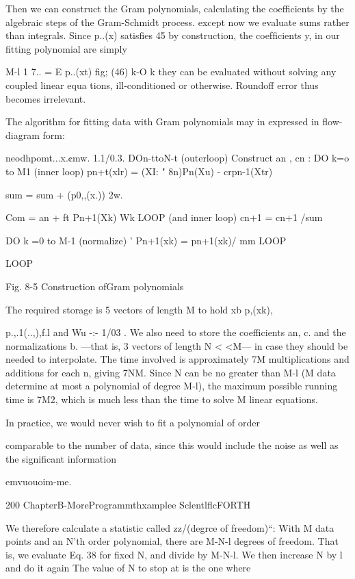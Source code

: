{{{{{{{Then we can construct the Gram polynomials, calculating the
coefficients by the algebraic steps of the Gram-Schmidt process.
except now we evaluate sums rather than integrals. Since p..(x)
satisﬁes 45 by construction, the coefﬁcients y, in our ﬁtting
polynomial are simply

M-l 1
7.. = E p..(xt) fig; (46)
k-O k
they can be evaluated without solving any coupled linear equa
tions, ill-conditioned or otherwise. Roundoff error thus becomes
irrelevant.

The algorithm for ﬁtting data with Gram polynomials may in
expressed in ﬂow-diagram form:

neodhpomt...x.¢mw. 1.1/0.3.
DOn-ttoN-t (outerloop)
Construct an , cn :
DO k=o to M1 (inner loop)
pn+t(xlr) = (XI: " 8n)Pn(Xu) - crpn-1(Xtr)

sum = sum + (p0,,(x.)) 2w.

Com = an + ft Pn+1(Xk) Wk
LOOP (and inner loop)
cn+1 = cn+1 /sum

DO k =0 to M-1 (normalize)
’ Pn+1(xk) = pn+1(xk)/ mm
LOOP

LOOP

 

 

Fig. 8-5 Construction ofGram polynomials

The required storage is 5 vectors of length M to hold xb p,(xk),

p.,.1(.\:.,),f.l and Wu -:- 1/03 . We also need to store the coefficients
an, c. and the normalizations b. —that is, 3 vectors of length
N < <M— in case they should be needed to interpolate. The time
involved is approximately 7M multiplications and additions for
each n, giving 7NM. Since N can be no greater than M-l (M data
determine at most a polynomial of degree M-l), the maximum
possible running time is 7M2, which is much less than the time to
solve M linear equations.

In practice, we would never wish to ﬁt a polynomial of order

comparable to the number of data, since this would include the
noise as well as the signiﬁcant information

emvuouoim-me.

200 ChapterB-MoreProgrammthxamplee SclentlﬂcFORTH

We therefore calculate a statistic called zz/(degrce of freedom)“:
With M data points and an N’th order polynomial, there are
M-N-l degrees of freedom. That is, we evaluate Eq. 38 for ﬁxed
N, and divide by M-N-l. We then increase N by l and do it again
The value of N to stop at is the one where

}}}}}}}

